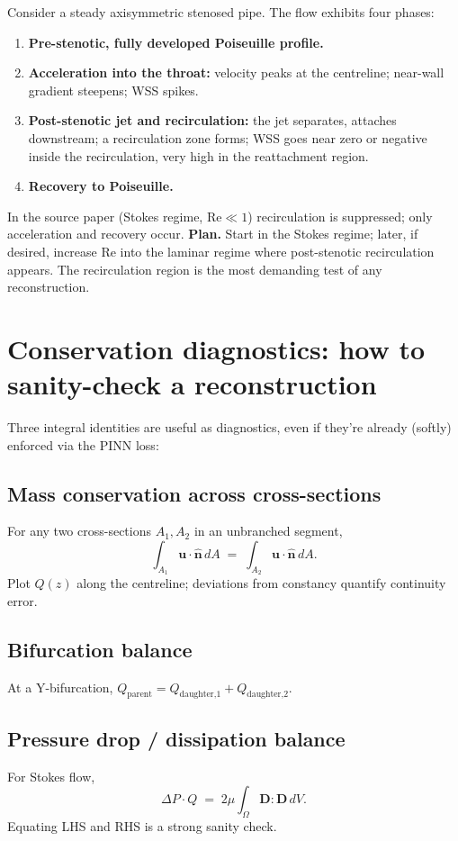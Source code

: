 \documentclass[11pt]{article}
\begin{document}
Consider a steady axisymmetric stenosed pipe. The flow exhibits four phases:
\begin{enumerate}[noitemsep]
  \item \textbf{Pre-stenotic, fully developed Poiseuille profile.}
  \item \textbf{Acceleration into the throat:} velocity peaks at the centreline; near-wall gradient steepens; WSS spikes.
  \item \textbf{Post-stenotic jet and recirculation:} the jet separates, attaches downstream; a recirculation zone forms; WSS goes near zero or negative inside the recirculation, very high in the reattachment region.
  \item \textbf{Recovery to Poiseuille.}
\end{enumerate}

In the source paper (Stokes regime, $\mathrm{Re} \ll 1$) recirculation is suppressed; only acceleration and recovery occur. \textbf{Plan.} Start in the Stokes regime; later, if desired, increase Re into the laminar regime where post-stenotic recirculation appears. The recirculation region is the most demanding test of any reconstruction.

\section{Conservation diagnostics: how to sanity-check a reconstruction}

Three integral identities are useful as diagnostics, even if they're already (softly) enforced via the PINN loss:

\subsection*{Mass conservation across cross-sections}
For any two cross-sections $A_1, A_2$ in an unbranched segment,
\[
\int_{A_1} \mathbf{u}\cdot\hat{\mathbf{n}}\,dA \;=\; \int_{A_2} \mathbf{u}\cdot\hat{\mathbf{n}}\,dA.
\]
Plot $Q(z)$ along the centreline; deviations from constancy quantify continuity error.

\subsection*{Bifurcation balance}
At a Y-bifurcation, $Q_{\text{parent}} = Q_{\text{daughter,1}} + Q_{\text{daughter,2}}$.

\subsection*{Pressure drop / dissipation balance}
For Stokes flow,
\[
\Delta P \cdot Q \;=\; 2\mu\!\int_\Omega \mathbf{D}:\mathbf{D}\,dV.
\]
Equating LHS and RHS is a strong sanity check.
\end{document}
